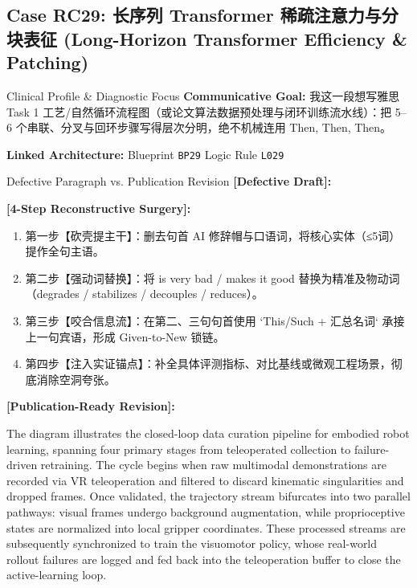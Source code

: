 \subsection{Case RC29: 长序列 Transformer 稀疏注意力与分块表征 (Long-Horizon Transformer Efficiency \& Patching)}\label{case:RC29}
\begin{ConceptBox}{Clinical Profile \& Diagnostic Focus}
\textbf{Communicative Goal:} 我这一段想写雅思 Task 1 工艺/自然循环流程图（或论文算法数据预处理与闭环训练流水线）：把 5--6 个串联、分叉与回环步骤写得层次分明，绝不机械连用 Then, Then, Then。\par
\textbf{Linked Architecture:} Blueprint \texttt{BP29} \enspace\textbar\enspace Logic Rule \texttt{L029}
\end{ConceptBox}
\begin{ExampleBox}{Defective Paragraph vs. Publication Revision}
\textbf{\color{TargetHighlight}[Defective Draft]:}\par
{}\par\vspace{6pt}
\textbf{\color{AcadForest}[4-Step Reconstructive Surgery]:}
\begin{enumerate}[label=\textbf{\color{AcadNavy}Step \arabic*:}, leftmargin=2em]
  \item 第一步【砍壳提主干】：删去句首 AI 修辞帽与口语词，将核心实体（≤5词）提作全句主语。
  \item 第二步【强动词替换】：将 is very bad / makes it good 替换为精准及物动词（degrades / stabilizes / decouples / reduces）。
  \item 第三步【咬合信息流】：在第二、三句句首使用 `This/Such + 汇总名词` 承接上一句宾语，形成 Given-to-New 锁链。
  \item 第四步【注入实证锚点】：补全具体评测指标、对比基线或微观工程场景，彻底消除空洞夸张。
\end{enumerate}\vspace{4pt}
\textbf{\color{AcadNavy}[Publication-Ready Revision]:}\par
The diagram illustrates the closed-loop data curation pipeline for embodied robot learning, spanning four primary stages from teleoperated collection to failure-driven retraining. The cycle begins when raw multimodal demonstrations are recorded via VR teleoperation and filtered to discard kinematic singularities and dropped frames. Once validated, the trajectory stream bifurcates into two parallel pathways: visual frames undergo background augmentation, while proprioceptive states are normalized into local gripper coordinates. These processed streams are subsequently synchronized to train the visuomotor policy, whose real-world rollout failures are logged and fed back into the teleoperation buffer to close the active-learning loop.
\end{ExampleBox}
